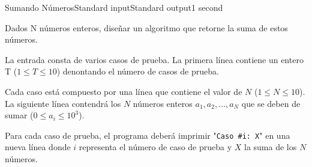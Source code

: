 \begin{problem}{Sumando Números}{Standard input}{Standard output}{1 second}{}

Dados N números enteros, diseñar un algoritmo que retorne la suma de estos números.

\InputFile

La entrada consta de varios casos de prueba. La primera línea contiene un entero T ($1 \leq T \leq 10$) denontando el número de casos de prueba.

Cada caso está compuesto por una línea que contiene el valor de $N$ ($1 \leq N \leq 10$). La siguiente línea contendrá los $N$ números enteros $a_1, a_2, \dots, a_N$ 
que se deben de sumar ($0 \leq a_i \leq 10^3$).

\OutputFile

Para cada caso de prueba, el programa deberá imprimir "\texttt{Caso \#i: X}" en una nueva línea donde $i$ representa el número de caso de prueba y $X$ la suma de los $N$ números.

\Example
\begin{example}
%
\end{example}

\end{problem}
